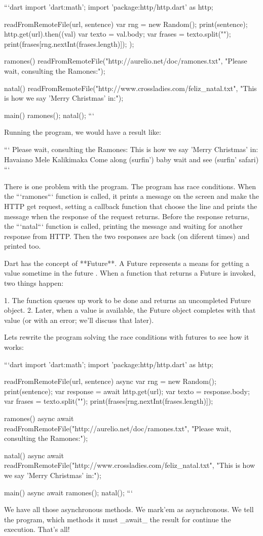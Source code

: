 ```dart
import 'dart:math';
import 'package:http/http.dart' as http;

readFromRemoteFile(url, sentence) {
  var rng = new Random();
  print(sentence);
  http.get(url).then((val){
    var texto = val.body;
    var frases = texto.split("\n");
    print(frases[rng.nextInt(frases.length)]);
  });
}

ramones() {
  readFromRemoteFile("http://aurelio.net/doc/ramones.txt",
    "Please wait, consulting the Ramones:");
}

natal() {
  readFromRemoteFile("http://www.crossladies.com/feliz_natal.txt",
    "This is how we say 'Merry Christmas' in:");
}

main() {
  ramones();
  natal();
}
```

Running the program, we would have a result like:

```
Please wait, consulting the Ramones:
This is how we say 'Merry Christmas' in:
Havaiano  Mele Kalikimaka
Come along (surfin') baby wait and see (surfin' safari)
```

There is one problem with the program. The program has race conditions. 
When the ```ramones``` function is called, it prints a message on the screen and
make the HTTP get request, setting a callback function that choose the line and 
prints the message when the response of the request returns. Before the response 
returns, the ```natal``` function is called, printing the message and waiting 
for another response from HTTP. Then the two responses are back (on diferent 
times) and printed too.

Dart has the concept of **Future**. A Future represents a means for getting a
value sometime in the future \cite{3_14} 
\cite{3_15} \cite{3_16}.
When a function that returns a Future is invoked, two things happen:

1. The function queues up work to be done and returns an uncompleted Future object.
2. Later, when a value is available, the Future object completes with that value
   (or with an error; we’ll discuss that later).

Lets rewrite the program solving the race conditions with futures to see how it 
works:

```dart
import 'dart:math';
import 'package:http/http.dart' as http;

readFromRemoteFile(url, sentence) async {
  var rng = new Random();
  print(sentence);
  var response = await http.get(url);
  var texto = response.body;
  var frases = texto.split("\n");
  print(frases[rng.nextInt(frases.length)]);
}

ramones() async {
  await readFromRemoteFile("http://aurelio.net/doc/ramones.txt",
    "Please wait, consulting the Ramones:");
}

natal() async {
  await readFromRemoteFile("http://www.crossladies.com/feliz_natal.txt",
    "This is how we say 'Merry Christmas' in:");
}

main() async {
  await ramones();
  natal();
}
```

We have all those asynchronous methods. We mark'em as asynchronous. We tell the 
program, which methods it must _await_ the result for continue the execution. 
That's all!